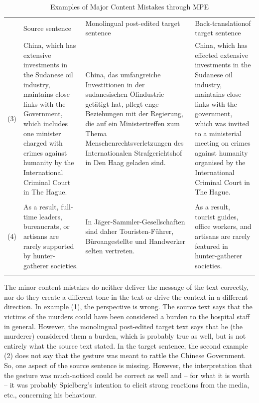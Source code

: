 \documentclass[output=paper]{langsci/langscibook}
\begin{document}
\begin{table}[t]
\begin{tabularx}{\textwidth}{lXp{3.6cm}p{3cm}} 
    & Source \newline sentence & Monolingual post-\newline edited target sentence & Back-translation\newline  of target sentence \\
\lsptoprule
(3) & China, which has extensive investments in the Sudanese oil industry, maintains close links with the Government, which includes one minister charged with crimes against humanity by the International Criminal Court in The Hague. & China, das umfangreiche Investitionen in der sudanesischen Ölindustrie getätigt hat, pflegt enge Beziehungen mit der Regierung, die auf ein Ministertreffen zum Thema Menschenrechtsverletzungen des Internationalen Strafgerichtshof in Den Haag geladen sind. & China, which has effected extensive investments in the Sudanese oil industry, maintains close links with the government, which was invited to a ministerial meeting on crimes against humanity organised by the International Criminal Court in The Hague.\\
\\
(4) & As a result, full-time leaders, bureaucrats, or artisans are rarely supported by hunter-gatherer societies. & In Jäger-Sammler-Gesellschaften sind daher Touristen-Führer, Büroangestellte und Handwerker selten vertreten. & As a result, tourist guides, office workers, and artisans are rarely featured in hunter-gatherer societies.\\
\lspbottomrule
\end{tabularx}
\caption{Examples of Major Content Mistakes through MPE}
\label{nitzke:tab:1b}
\end{table}

The minor content mistakes do neither deliver the message of the text correctly, nor do they create a different tone in the text or drive the context in a different direction. In example (1), the perspective is wrong. The source text says that the victims of the murders could have been considered a burden to the hospital staff in general. However, the monolingual post-edited target text says that he (the murderer) considered them a burden, which is probably true as well, but is not entirely what the source text stated. In the target sentence, the second example (2) does not say that the gesture was meant to rattle the Chinese Government. So, one aspect of the source sentence is missing. However, the interpretation that the gesture was much-noticed could be correct as well and -- for what it is worth -- it was probably Spielberg's intention to elicit strong reactions from the media, etc., concerning his behaviour.
\end{document}
